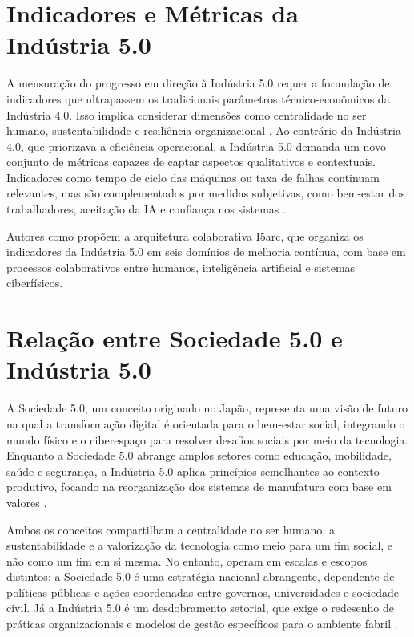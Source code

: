 \section{Indicadores e Métricas da Indústria 5.0}

A mensuração do progresso em direção à Indústria 5.0 requer a formulação de indicadores que ultrapassem os tradicionais parâmetros técnico-econômicos da Indústria 4.0.
Isso implica considerar dimensões como centralidade no ser humano, sustentabilidade e resiliência organizacional \cite{euCommission2021, Nahavandi2019}.
Ao contrário da Indústria 4.0, que priorizava a eficiência operacional, a Indústria 5.0 demanda um novo conjunto de métricas capazes de captar aspectos qualitativos e contextuais.
Indicadores como tempo de ciclo das máquinas ou taxa de falhas continuam relevantes, mas são complementados por medidas subjetivas, como bem-estar dos trabalhadores, aceitação da IA e confiança nos sistemas \cite{TOTH2023}.

Autores como  propõem a arquitetura colaborativa I5arc, que organiza os indicadores da Indústria 5.0 em seis domínios de melhoria contínua, com base em processos colaborativos entre humanos, inteligência artificial e sistemas ciberfísicos.


\section{Relação entre Sociedade 5.0 e Indústria 5.0}

A Sociedade 5.0, um conceito originado no Japão, representa uma visão de futuro na qual a transformação digital é orientada para o bem-estar social, integrando o mundo físico e o ciberespaço para resolver desafios sociais por meio da tecnologia.
Enquanto a Sociedade 5.0 abrange amplos setores como educação, mobilidade, saúde e segurança, a Indústria 5.0 aplica princípios semelhantes ao contexto produtivo, focando na reorganização dos sistemas de manufatura com base em valores \cite{Santos2025,Xu2021}.

Ambos os conceitos compartilham a centralidade no ser humano, a sustentabilidade e a valorização da tecnologia como meio para um fim social, e não como um fim em si mesma.
No entanto, operam em escalas e escopos distintos: a Sociedade 5.0 é uma estratégia nacional abrangente, dependente de políticas públicas e ações coordenadas entre governos, universidades e sociedade civil.
Já a Indústria 5.0 é um desdobramento setorial, que exige o redesenho de práticas organizacionais e modelos de gestão específicos para o ambiente fabril \cite{PIZON2023, TOTH2023}.

